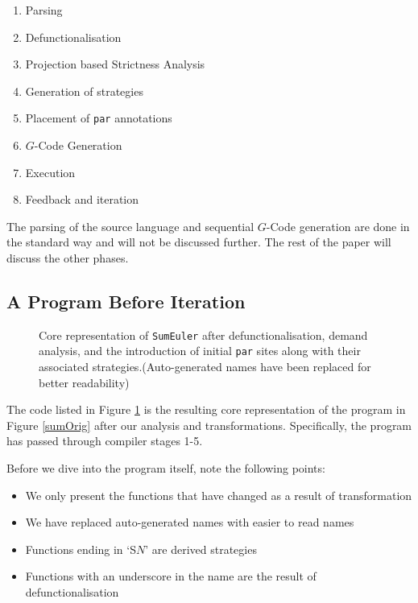 \begin{enumerate}
    \item Parsing
    \item Defunctionalisation
    \item Projection based Strictness Analysis
    \item Generation of strategies
    \item Placement of \verb-par- annotations
    \item $G$-Code Generation
    \item Execution
    \item Feedback and iteration
\end{enumerate}

The parsing of the source language and sequential $G$-Code generation are done
in the standard way and will not be discussed further. The rest of the paper will
discuss the other phases.

\subsection{A Program Before Iteration}

\begin{figure}[t!]
  
\caption{Core representation of \texttt{SumEuler} after defunctionalisation, demand
         analysis, and the introduction of initial \texttt{par} sites along
         with their associated strategies.(Auto-generated names have been
         replaced for better readability)}
\label{sumLast}
\end{figure}

The code listed in Figure \ref{sumLast} is the resulting core representation
of the program in Figure \ref{sumOrig} after our analysis and transformations.
Specifically, the program has passed through compiler stages 1-5.

Before we dive into the program itself, note the following points:

\begin{itemize}
    \item We only present the functions that have changed as a result of transformation
    \item We have replaced auto-generated names with easier to read names
    \item Functions ending in `S$N$' are derived strategies
    \item Functions with an underscore in the name are the result of defunctionalisation
\end{itemize}

